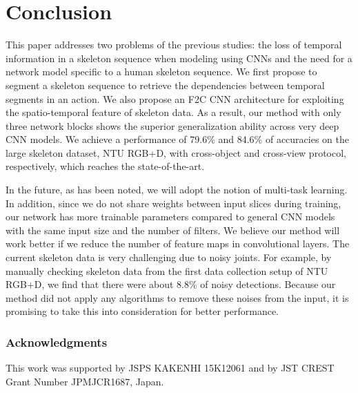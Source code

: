 \documentclass{bmvc2k}
\begin{document}
\section{Conclusion}
	\label{sec:conclusion}
This paper addresses two problems of the previous studies: the loss of temporal information in a skeleton sequence when modeling using CNNs and the need for a network model specific to a human skeleton sequence. We first propose to segment a skeleton sequence to retrieve the dependencies between temporal segments in an action. We also propose an F2C CNN architecture for exploiting the spatio-temporal feature of skeleton data. As a result, our method with only three network blocks shows the superior generalization ability across very deep CNN models. We achieve a performance of 79.6\% and 84.6\% of accuracies on the large skeleton dataset, NTU RGB+D,  with cross-object and cross-view protocol, respectively, which reaches the state-of-the-art.   

In the future, as has been noted, we will adopt the notion of multi-task learning. In addition, since we do not share weights between input slices during training, our network has more trainable parameters compared to general CNN models with the same input size and the number of filters. We believe our method will work better if we reduce the number of feature maps in convolutional layers. The current skeleton data is very challenging due to noisy joints. For example, by manually checking skeleton data from the first data collection setup of NTU RGB+D,  we find that there were about 8.8\% of noisy detections. Because our method did not apply any algorithms to remove these noises from the input, it is promising to take this into consideration for better performance.
    
\subsubsection*{Acknowledgments}
This work was supported by JSPS KAKENHI 15K12061 and by JST CREST Grant Number JPMJCR1687, Japan.



\end{document}
